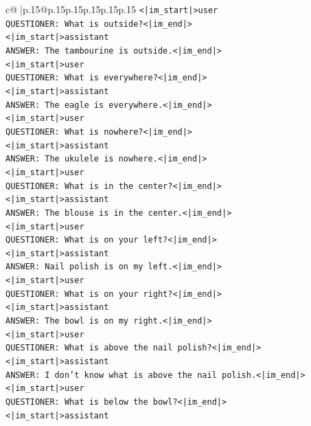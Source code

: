 \documentclass{article}
\begin{document}
{\begin{supertabular}{c@{$\;$}|p{.15\linewidth}@{}p{.15\linewidth}p{.15\linewidth}p{.15\linewidth}p{.15\linewidth}p{.15\linewidth}}
{{{\texttt{<|im\_start|>user} \\
\texttt{QUESTIONER: What is outside?<|im\_end|>} \\
\texttt{<|im\_start|>assistant} \\
\texttt{ANSWER: The tambourine is outside.<|im\_end|>} \\
\texttt{<|im\_start|>user} \\
\texttt{QUESTIONER: What is everywhere?<|im\_end|>} \\
\texttt{<|im\_start|>assistant} \\
\texttt{ANSWER: The eagle is everywhere.<|im\_end|>} \\
\texttt{<|im\_start|>user} \\
\texttt{QUESTIONER: What is nowhere?<|im\_end|>} \\
\texttt{<|im\_start|>assistant} \\
\texttt{ANSWER: The ukulele is nowhere.<|im\_end|>} \\
\texttt{<|im\_start|>user} \\
\texttt{QUESTIONER: What is in the center?<|im\_end|>} \\
\texttt{<|im\_start|>assistant} \\
\texttt{ANSWER: The blouse is in the center.<|im\_end|>} \\
\texttt{<|im\_start|>user} \\
\texttt{QUESTIONER: What is on your left?<|im\_end|>} \\
\texttt{<|im\_start|>assistant} \\
\texttt{ANSWER: Nail polish is on my left.<|im\_end|>} \\
\texttt{<|im\_start|>user} \\
\texttt{QUESTIONER: What is on your right?<|im\_end|>} \\
\texttt{<|im\_start|>assistant} \\
\texttt{ANSWER: The bowl is on my right.<|im\_end|>} \\
\texttt{<|im\_start|>user} \\
\texttt{QUESTIONER: What is above the nail polish?<|im\_end|>} \\
\texttt{<|im\_start|>assistant} \\
\texttt{ANSWER: I don't know what is above the nail polish.<|im\_end|>} \\
\texttt{<|im\_start|>user} \\
\texttt{QUESTIONER: What is below the bowl?<|im\_end|>} \\
\texttt{<|im\_start|>assistant} \\
}}}
\end{supertabular}}
\end{document}
